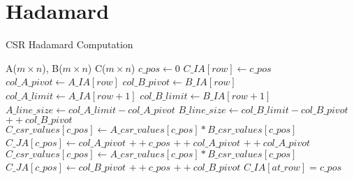 \documentclass{article}
\begin{document}
\section{Hadamard}
\begin{algorithm}
\caption{CSR Hadamard Computation}\label{hada}
\begin{algorithmic}[1]

\Require A($m\times n$), B($m\times n$)
\Ensure C($m\times n$)
\Statex
\State $c\_pos \gets 0$
    \State $C\_IA[row] \gets c\_pos$
    \State $col\_A\_pivot \gets A\_IA[row]$
    \State $col\_B\_pivot \gets B\_IA[row]$
    \State $col\_A\_limit \gets A\_IA[row+1]$
    \State $col\_B\_limit \gets B\_IA[row+1]$
    \State $A\_line\_size \gets col\_A\_limit - col\_A\_pivot$
    \State $B\_line\_size \gets col\_B\_limit - col\_B\_pivot$
    \Statex
    \State $++col\_B\_pivot$
    \EndFor
               \State $C\_csr\_values[c\_pos] \gets A\_csr\_values[c\_pos] * B\_csr\_values[c\_pos]$
               \State $C\_JA[c\_pos] \gets col\_A\_pivot$
               \State $++c\_pos$
            \EndIf
            \State $++col\_A\_pivot$
        \EndFor
    \Else
    \State $++col\_A\_pivot$
    \EndFor
               \State $C\_csr\_values[c\_pos] \gets A\_csr\_values[c\_pos] * B\_csr\_values[c\_pos]$
               \State $C\_JA[c\_pos] \gets col\_B\_pivot$
               \State $++c\_pos$
            \EndIf
            \State $++col\_B\_pivot$
        \EndFor
    \EndIf
\EndFor
    \Statex
\State $C\_IA[at\_row]=c\_pos$
\end{algorithmic}
\end{algorithm}
\end{document}
